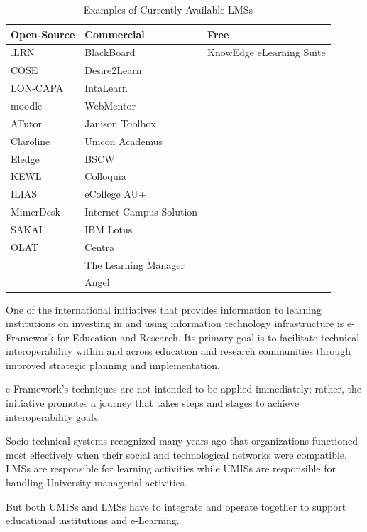 \documentclass[12pt,a4paper,final,twoside,onecolumn,titlepage]{book}
\begin{document}
\begin{table}
\begin{center}
\caption{Examples of Currently Available \gls{LMS}s}
\begin{tabularx}{\textwidth}{|X|X|X|}
\hline Open-Source	& Commercial & Free \\
\hline .LRN & BlackBoard & KnowEdge eLearning Suite \\
\hline COSE & Desire2Learn & \\
\hline LON-CAPA & IntaLearn & \\
\hline moodle & WebMentor & \\
\hline ATutor & Janison Toolbox & \\
\hline Claroline & Unicon Academus & \\
\hline Eledge & BSCW & \\
\hline KEWL & Colloquia & \\
\hline ILIAS &  eCollege AU+ & \\
\hline MimerDesk & Internet Campus Solution & \\
\hline SAKAI & IBM Lotus & \\
\hline OLAT & Centra & \\
\hline  & The Learning Manager & \\
\hline  & Angel & \\
\hline
\end{tabularx}
\end{center}
\label{MsT1}
\end{table}

One of the international initiatives that provides information to learning institutions on investing in and using information technology infrastructure is e-Framework for Education and Research. Its primary goal is to facilitate technical interoperability within and across education and research communities through improved strategic planning and implementation.

e-Framework's techniques are not intended to be applied immediately; rather, the initiative promotes a journey that takes steps and stages to achieve interoperability goals.

Socio-technical systems recognized many years ago that organizations functioned most effectively when their social and technological networks were compatible. \gls{LMS}s are responsible for learning activities while \gls{UMIS}s are responsible for handling University managerial activities.

But both \gls{UMIS}s and \gls{LMS}s have to integrate and operate together to support educational institutions and e-Learning.
\end{document}
